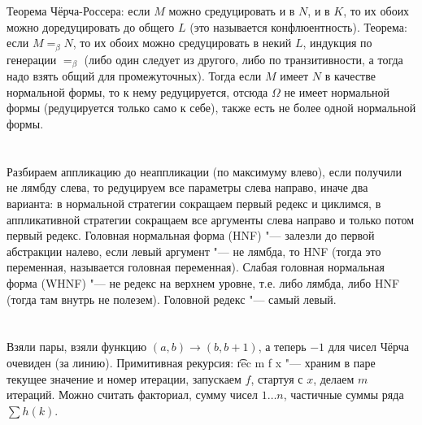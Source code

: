 \section{} %
Теорема Чёрча-Россера: если $M$ можно средуцировать и в $N$, и в $K$, то их обоих можно доредуцировать
до общего $L$ (это называется конфлюентность).
Теорема: если $M=_\beta N$, то их обоих можно средуцировать в некий $L$,
индукция по генерации $=_\beta$ (либо один следует из другого, либо по транзитивности,
а тогда надо взять общий для промежуточных).
Тогда если $M$ имеет $N$ в качестве нормальной формы, то к нему редуцируется, отсюда
$\Omega$ не имеет нормальной формы (редуцируется только само к себе),
также есть не более одной нормальной формы.

\section{} %
Разбираем аппликацию до неаппликации (по максимуму влево), если получили
не лямбду слева, то редуцируем все параметры слева направо,
иначе два варианта: в нормальной стратегии сокращаем первый редекс и циклимся,
в аппликативной стратегии сокращаем все аргументы слева направо и только потом первый редекс.
Головная нормальная форма (HNF) "--- залезли до первой абстракции налево, если левый аргумент "--- не лямбда, то HNF (тогда
это переменная, называется головная переменная).
Слабая головная нормальная форма (WHNF) "--- не редекс на верхнем уровне, т.е. либо лямбда, либо HNF (тогда там внутрь не полезем).
Головной редекс "--- самый левый.
\TODO

\section{} %
Взяли пары, взяли функцию $(a, b) \to (b, b+1)$, а теперь $-1$ для чисел Чёрча очевиден (за линию).
Примитивная рекурсия: \t{rec m f x} "--- храним в паре текущее значение и номер итерации,
запускаем $f$, стартуя с $x$, делаем $m$ итераций.
Можно считать факториал, сумму чисел $1\dots n$, частичные суммы ряда $\sum h(k)$.
